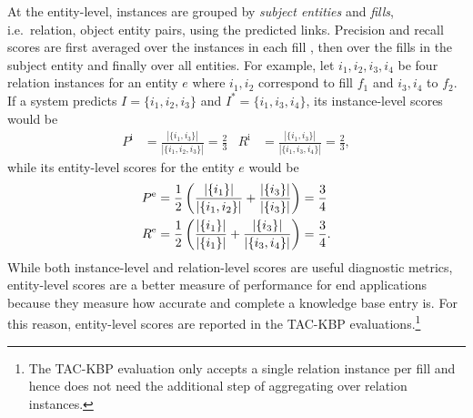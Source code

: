 At the entity-level, instances are grouped by \textit{subject entities} and \textit{fills}, i.e.\ relation, object entity pairs, using the predicted links. Precision and recall scores are first averaged over the instances in each fill , then over the fills in the subject entity and finally over all entities. For example, let $i_1, i_2, i_3, i_4$ be four relation instances for an entity $e$ where $i_1, i_2$ correspond to fill $f_1$ and $i_3, i_4$ to $f_2$. If a system predicts $I = \{i_1, i_2, i_3\}$ and $I^* = \{i_1, i_3, i_4\}$, its instance-level scores would be
\begin{align*}
  P^\text{i} &= \frac{|\{i_1, i_3\}|}{|\{i_1, i_2, i_3\}|} = \frac{2}{3} &
  R^\text{i} &= \frac{|\{i_1, i_3\}|}{|\{i_1, i_3, i_4\}|} = \frac{2}{3},
\end{align*}
while its entity-level scores for the entity $e$ would be
\begin{align*}
  P^\text{e} &= \frac{1}{2} \left(\frac{|\{i_1\}|}{|\{i_1, i_2\}|} + \frac{|\{i_3\}|}{|\{i_3\}|} \right) = \frac{3}{4} \\
  R^\text{e} &= \frac{1}{2} \left(\frac{|\{i_1\}|}{|\{i_1\}|} + \frac{|\{i_3\}|}{|\{i_3, i_4\}|} \right) = \frac{3}{4}.
\end{align*}
While both instance-level and relation-level scores are useful diagnostic metrics, entity-level scores are a better measure of performance for end applications because they measure how accurate and complete a knowledge base entry is.
For this reason, entity-level scores are reported in the TAC-KBP evaluations.\footnote{%
  The TAC-KBP evaluation only accepts a single relation instance per fill and hence does not need the additional step of aggregating over relation instances.
}

